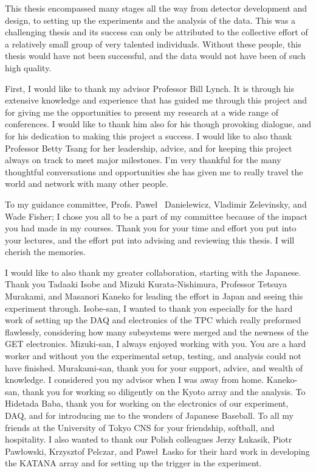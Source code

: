 \documentclass{altmsuphddissertation}
\begin{document}
\begin{acknowledgment}
This thesis encompassed many stages all the way from detector development and design, to setting up the experiments and the analysis of the data. This was a challenging thesis and its success can only be attributed to the collective effort of a relatively small group of very talented individuals. Without these people, this thesis would have not been successful, and the data would not have been of such high quality. 

First, I would like to thank my advisor Professor Bill Lynch. It is through his extensive knowledge and experience that has guided me through this project and for giving me the opportunities to present my research at a wide range of conferences. I would like to thank him also for his though provoking dialogue, and for his dedication to making this project a success. I would like to also thank Professor Betty Tsang for her leadership, advice, and for keeping this project always on track to meet major milestones. I'm very thankful for the many thoughtful conversations and opportunities she has given me to really travel the world and network with many other people.  

To my guidance committee, Profs. Pawe\l~ Danielewicz, Vladimir Zelevinsky, and Wade Fisher; I chose you all to be a part of my committee because of the impact you had made in my courses. Thank you for your time and effort you put into your lectures, and the effort put into advising and reviewing this thesis. I will cherish the memories.

I would like to also thank my greater collaboration, starting with the Japanese. Thank you Tadaaki Isobe and Mizuki Kurata-Nishimura, Professor Tetsuya Murakami, and Masanori Kaneko for leading the effort in Japan and seeing this experiment through. Isobe-san, I wanted to thank you especially for the hard work of setting up the DAQ and electronics of the TPC which really preformed flawlessly, considering how many subsystems were merged and the newness of the GET electronics. Mizuki-san, I always enjoyed working with you. You are a hard worker and without you the experimental setup, testing, and analysis could not have finished. Murakami-san, thank you for your support, advice, and wealth of knowledge. I considered you my advisor when I was away from home. Kaneko-san, thank you for working so diligently on the Kyoto array and the analysis. To Hidetada Baba, thank you for working on the electronics of our experiment, DAQ, and for introducing me to the wonders of Japanese Baseball. To all my friends at the University of Tokyo CNS for your friendship, softball, and hospitality. I also wanted to thank our Polish colleagues Jerzy \L ukasik, Piotr Paw\l owski, Krzysztof Pelczar, and Pawe\l ~\L asko for their hard work in developing the KATANA array and for setting up the trigger in the experiment. 


\end{acknowledgment}
\end{document}
